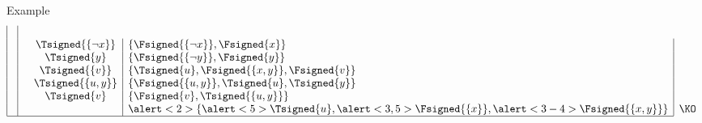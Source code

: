 \begin{frame}{Example}
\[\begin{array}{|c|cc|l|l}
      \\
                 &                                          &                \Tsigned{\{\neg x\}}&\{\Fsigned{\{\neg x\}},\Fsigned{x}\}&
      \\
                 &                                          &                \Tsigned{y}         &\{\Fsigned{\{\neg y\}},\Fsigned{y}\}&
      \\
                 &                                          &                \Tsigned{\{v\}}     &\{\Tsigned{u},\Fsigned{\{x,y\}},\Fsigned\{v\}\}&
      \\
                 &                                          &                \Tsigned{\{u,y\}}   &\{\Fsigned{\{u,y\}},\Tsigned{u},\Tsigned{y}\}&
      \\
                 &                                          &                \Tsigned{v}         &\{\Fsigned{v},\Tsigned{\{u,y\}}\}&
      \\
                 &                                          &                                    &\alert<2>{\{\alert<5>{\Tsigned{u}},\alert<3,5>{\Fsigned{\{x\}}},\alert<3-4>{\Fsigned{\{x,y\}}}\}} &\text{\KO}
      \\\cline{1-4}
    \end{array}
  \]
\end{frame}
